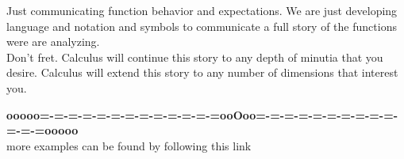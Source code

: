 \documentclass{ximera}
\begin{document}
Just communicating function behavior and expectations.  We are just developing language and notation and symbols to communicate a full story of the functions were are analyzing. \\


Don't fret. Calculus will continue this story to any depth of minutia that you desire. Calculus will extend this story to any number of dimensions that interest you.











\begin{center}
\textbf{\textcolor{green!50!black}{ooooo=-=-=-=-=-=-=-=-=-=-=-=-=ooOoo=-=-=-=-=-=-=-=-=-=-=-=-=ooooo}} \\

more examples can be found by following this link\\ 

\end{center}
\end{document}
